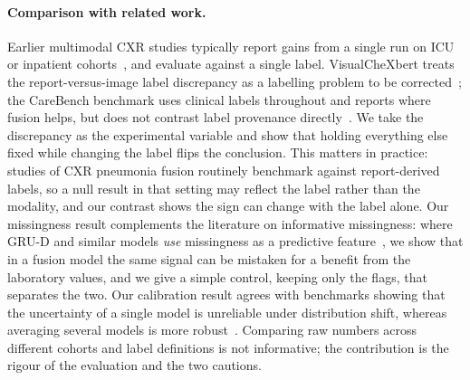 \documentclass[twocolumn, final]{svjour3}
\begin{document}
\paragraph{Comparison with related work.} Earlier multimodal CXR studies typically
report gains from a single run on ICU or inpatient
cohorts~\citep{hayat2022medfuse,soenksen2022multimodal,lee2024multimodal}, and evaluate
against a single label. VisualCheXbert treats the report-versus-image label discrepancy as a
labelling problem to be corrected~\citep{jain2021visualchexbert}; the CareBench benchmark uses
clinical labels throughout and reports where fusion helps, but does not contrast label
provenance directly~\citep{yin2026multimodal}. We take the discrepancy as the experimental
variable and show that holding everything else fixed while changing the label flips the
conclusion. This matters in practice: studies of CXR pneumonia fusion routinely benchmark
against report-derived labels, so a null result in that setting may reflect the label rather
than the modality, and our contrast shows the sign can change with the label alone. Our
missingness result complements the literature on informative
missingness: where GRU-D and similar models \emph{use} missingness as a predictive
feature~\citep{che2018recurrent}, we show that in a fusion model the same signal can be
mistaken for a benefit from the laboratory values, and we give a simple control,
keeping only the flags, that separates the two. Our calibration result agrees with
benchmarks showing that the uncertainty of a single model is unreliable under
distribution shift, whereas averaging several models is more robust~\citep{ovadia2019trust}.
Comparing raw numbers across different cohorts and label definitions is not informative;
the contribution is the rigour of the evaluation and the two cautions.
\end{document}
